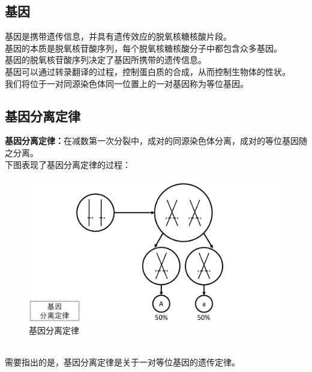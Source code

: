 \documentclass[UTF8]{ctexart}
\begin{document}
\subsection{基因}
    基因是携带遗传信息，并具有遗传效应的脱氧核糖核酸片段。\\[3mm]
    基因的本质是脱氧核苷酸序列，每个脱氧核糖核酸分子中都包含众多基因。\\[3mm]
    基因的脱氧核苷酸序列决定了基因所携带的遗传信息。\\[3mm]
    基因可以通过转录翻译的过程，控制蛋白质的合成，从而控制生物体的性状。\\[3mm]
    我们将位于一对同源染色体同一位置上的一对基因称为等位基因。\\

\subsection{基因分离定律}
    \textbf{基因分离定律：}在减数第一次分裂中，成对的同源染色体分离，成对的等位基因随之分离。\\[3mm]
    下图表现了基因分离定律的过程：
    \begin{figure}[h]
        \begin{center}
            \includegraphics[width=14cm]{BiologyImage/57.jpg}
        \end{center}
        \caption{基因分离定律}
    \end{figure}\\[1mm]
    需要指出的是，基因分离定律是关于一对等位基因的遗传定律。

\newpage
\end{document}
